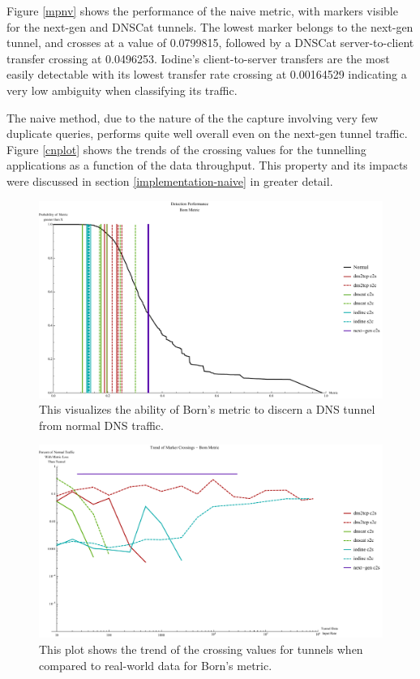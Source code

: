 \documentclass[12pt]{report}
\theoremstyle{remark}
\theoremstyle{definition}
\theoremstyle{definition}
\theoremstyle{definition}
\begin{document}
Figure \ref{mpnv} shows the performance of the naive metric, with markers
visible for the next-gen and DNSCat tunnels. The lowest marker belongs to the
next-gen tunnel, and crosses at a value of 0.0799815, followed by a DNSCat
server-to-client transfer crossing at 0.0496253. Iodine's client-to-server
transfers are the most easily detectable with its lowest transfer rate crossing
at 0.00164529 indicating a very low ambiguity when classifying its traffic.

The naive method, due to the nature of the the capture involving very few
duplicate queries, performs quite well overall even on the next-gen tunnel
traffic. Figure \ref{cnplot} shows the trends of the crossing values for the
tunnelling applications as a function of the data throughput. This property
and its impacts were discussed in section \ref{implementation-naive} in greater
detail.

\begin{figure}
\centering
\includegraphics[width=\textwidth]{figures/mpbv.pdf}
\caption[Tunnel Detection Performance - Born's Metric]{This visualizes the
ability of Born's metric to discern a DNS tunnel from normal DNS traffic.}
\label{mpbv}
\end{figure}

\begin{figure}
\centering
\includegraphics[width=\textwidth]{figures/cbplot.pdf}
\caption[Trend of Crossing Value for Tunnels - Born's Metric]{This plot shows
the trend of the crossing values for tunnels when compared to real-world data 
for Born's metric.}
\label{cbplot}
\end{figure}
\end{document}
